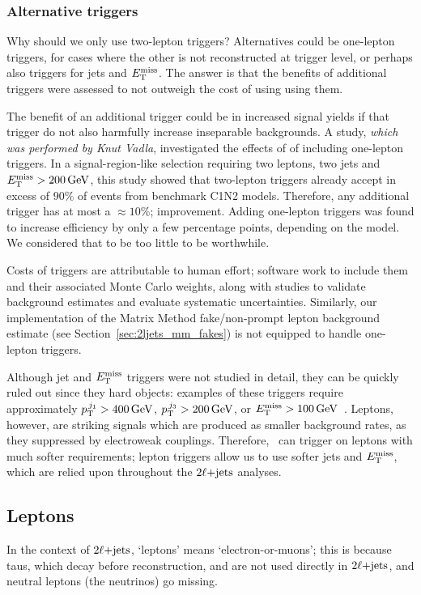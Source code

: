 \subsubsection{Alternative triggers}
Why should we only use two-lepton triggers?
Alternatives could be one-lepton triggers, for cases where the other is not
reconstructed at trigger level, or perhaps also triggers for jets and $\met$.
The answer is that the benefits of additional triggers were assessed to not
outweigh the cost of using using them.

The benefit of an additional trigger could be in increased signal yields if
that trigger do not also harmfully increase inseparable backgrounds.
A study, \textit{which was performed by Knut Vadla}, investigated the effects
of of including one-lepton triggers.
In a signal-region-like selection requiring two leptons, two jets and
$\met > 200\,\eV[G]$, this study showed that two-lepton triggers already accept
in excess of $90\%$ of events from benchmark C1N2 models.
Therefore, any additional trigger has at most a $\approx10\%$;
improvement. Adding one-lepton triggers was found to increase efficiency by
only a few percentage points, depending on the model.
We considered that to be too little to be worthwhile.

Costs of triggers are attributable to human effort;
software work to include them and their associated Monte Carlo weights, along
with studies to validate background estimates and evaluate systematic
uncertainties.
Similarly, our implementation of the Matrix Method fake/non-prompt lepton
background estimate (see Section~\ref{sec:2ljets_mm_fakes}) is not equipped to
handle one-lepton triggers.

Although jet and $\met$ triggers were not studied in detail, they can be
quickly ruled out since they hard objects: examples of these triggers require
approximately $\ptjone > 400\,\eV[G]$, $p_\mathrm{T}^{\,j_3} > 200\,\eV[G]$, or
$\met > 100\,\eV[G]$~\cite{atlas_twiki_lowest_unprescaled}.
Leptons, however, are striking signals which are produced as smaller background
rates, as they suppressed by electroweak couplings.
Therefore, \atlas\ can trigger on leptons with much softer requirements;
lepton triggers allow us to use softer jets and $\met$, which are relied upon
throughout the $\twoljets$ analyses.


\subsection{Leptons}
In the context of $\twoljets$, `leptons' means `electron-or-muons';
this is because taus, which decay before reconstruction, and are not used
directly in $\twoljets$, and neutral leptons (the neutrinos) go missing.

